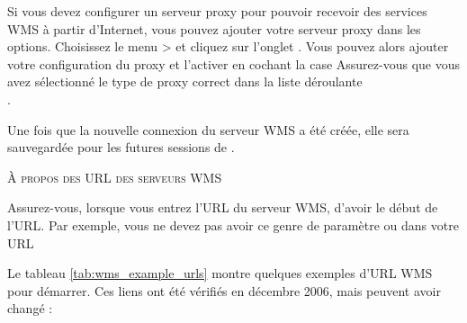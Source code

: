 Si vous devez configurer un serveur proxy pour pouvoir recevoir des services
WMS à partir d'Internet, vous pouvez ajouter votre serveur proxy dans les
options. Choisissez le menu  >
 et cliquez sur l'onglet
. Vous pouvez alors ajouter votre configuration du proxy et
l'activer en cochant la case 
Assurez-vous que vous avez sélectionné le type de proxy correct dans la liste 
déroulante\\ .

Une fois que la nouvelle connexion du serveur WMS a été créée, elle sera
sauvegardée pour les futures sessions de \qg.

\begin{Tip}[ht]\caption{\textsc{À propos des URL des serveurs WMS}}
Assurez-vous, lorsque vous entrez l'URL du serveur WMS, d'avoir le
début de l'URL. Par exemple, vous ne devez pas avoir ce genre de paramètre 
 ou 
dans votre URL
\end{Tip}

Le tableau \ref{tab:wms_example_urls} montre quelques exemples d'URL WMS
pour démarrer. Ces liens ont été vérifiés en décembre 2006, mais peuvent
avoir changé :


